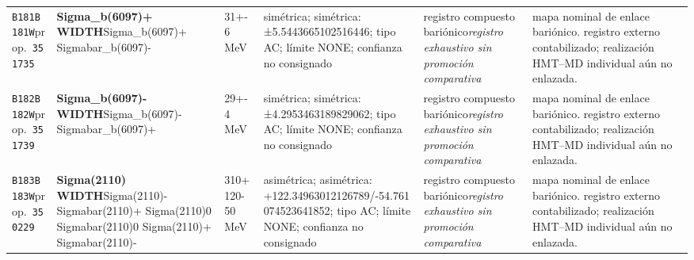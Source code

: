 \begin{landscape}
\begin{longtable}{L{1.85cm}L{4.45cm}L{2.35cm}L{4.05cm}L{3.35cm}L{7.15cm}}
\texttt{B181}\newline \texttt{B181W}\newline prop.\ \texttt{351735} & \textbf{Sigma\_\allowbreak{}b(6097)+ WIDTH}\newline Sigma\_\allowbreak{}b(6097)+ \textbar{}\allowbreak{} Sigmabar\_\allowbreak{}b(6097)- & 31+-6\,MeV & simétrica; simétrica: ±5.5443665102516446; tipo AC; límite NONE; confianza no consignado & registro compuesto bariónico\newline \emph{registro exhaustivo sin promoción comparativa} & mapa nominal de enlace bariónico. registro externo contabilizado; realización HMT--MD individual aún no enlazada. \\
\texttt{B182}\newline \texttt{B182W}\newline prop.\ \texttt{351739} & \textbf{Sigma\_\allowbreak{}b(6097)- WIDTH}\newline Sigma\_\allowbreak{}b(6097)- \textbar{}\allowbreak{} Sigmabar\_\allowbreak{}b(6097)+ & 29+-4\,MeV & simétrica; simétrica: ±4.2953463189829062; tipo AC; límite NONE; confianza no consignado & registro compuesto bariónico\newline \emph{registro exhaustivo sin promoción comparativa} & mapa nominal de enlace bariónico. registro externo contabilizado; realización HMT--MD individual aún no enlazada. \\
\texttt{B183}\newline \texttt{B183W}\newline prop.\ \texttt{350229} & \textbf{Sigma(2110) WIDTH}\newline Sigma(2110)- \textbar{}\allowbreak{} Sigmabar(2110)+ \textbar{}\allowbreak{} Sigma(2110)0 \textbar{}\allowbreak{} Sigmabar(2110)0 \textbar{}\allowbreak{} Sigma(2110)+ \textbar{}\allowbreak{} Sigmabar(2110)- & 310+120-50\,MeV & asimétrica; asimétrica: +122.34963012126789/-54.761074523641852; tipo AC; límite NONE; confianza no consignado & registro compuesto bariónico\newline \emph{registro exhaustivo sin promoción comparativa} & mapa nominal de enlace bariónico. registro externo contabilizado; realización HMT--MD individual aún no enlazada. \\

\end{longtable}
\end{landscape}
